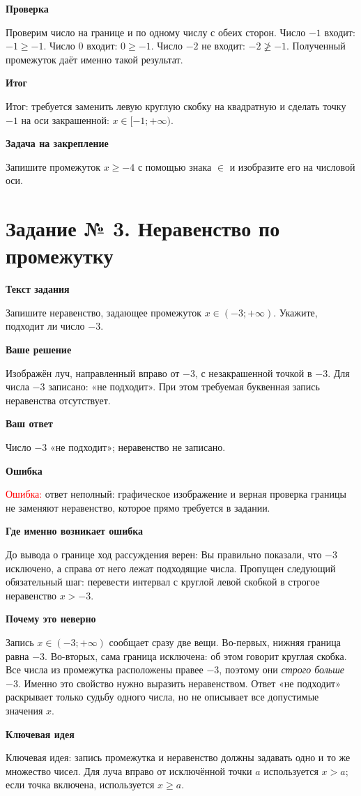 \documentclass[12pt,a4paper]{article}
\newcommand{\reviewlabel}[1]{\medskip\noindent\textbf{#1}\par}
\begin{document}
\reviewlabel{Проверка}
Проверим число на границе и по одному числу с обеих сторон. Число $-1$ входит: $-1\ge-1$. Число $0$ входит: $0\ge-1$. Число $-2$ не входит: $-2\not\ge-1$. Полученный промежуток даёт именно такой результат.

\reviewlabel{Итог}
\textcolor{teal!60!black}{Итог:} требуется заменить левую круглую скобку на квадратную и сделать точку $-1$ на оси закрашенной: $x\in[-1;+\infty)$.

\reviewlabel{Задача на закрепление}
Запишите промежуток $x\ge-4$ с помощью знака $\in$ и изобразите его на числовой оси.
\newpage

\label{task:3}
\section*{Задание № 3. Неравенство по промежутку}
\reviewlabel{Текст задания}
Запишите неравенство, задающее промежуток $x\in(-3;+\infty)$. Укажите, подходит ли число $-3$.

\reviewlabel{Ваше решение}
Изображён луч, направленный вправо от $-3$, с незакрашенной точкой в $-3$. Для числа $-3$ записано: «не подходит». При этом требуемая буквенная запись неравенства отсутствует.

\reviewlabel{Ваш ответ}
Число $-3$ «не подходит»; неравенство не записано.

\reviewlabel{Ошибка}
\textcolor{red}{Ошибка:} ответ неполный: графическое изображение и верная проверка границы не заменяют неравенство, которое прямо требуется в задании.

\reviewlabel{Где именно возникает ошибка}
До вывода о границе ход рассуждения верен: Вы правильно показали, что $-3$ исключено, а справа от него лежат подходящие числа. Пропущен следующий обязательный шаг: перевести интервал с круглой левой скобкой в строгое неравенство $x>-3$.

\reviewlabel{Почему это неверно}
Запись $x\in(-3;+\infty)$ сообщает сразу две вещи. Во-первых, нижняя граница равна $-3$. Во-вторых, сама граница исключена: об этом говорит круглая скобка. Все числа из промежутка расположены правее $-3$, поэтому они \emph{строго больше} $-3$. Именно это свойство нужно выразить неравенством. Ответ «не подходит» раскрывает только судьбу одного числа, но не описывает все допустимые значения $x$.

\reviewlabel{Ключевая идея}
\textcolor{blue!60!black}{Ключевая идея:} запись промежутка и неравенство должны задавать одно и то же множество чисел. Для луча вправо от исключённой точки $a$ используется $x>a$; если точка включена, используется $x\ge a$.
\end{document}
